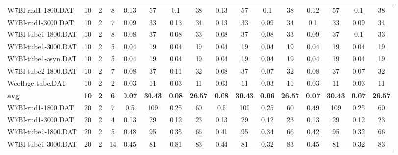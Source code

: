 \begin{sidewaystable}[!ht]
{\begin{tabular}{lccccccccccccccc}
W7BI-rnd1-1800.DAT & 10 & 2 & 8 & 0.13 & 57 &  \textcolor{blue2}{0.1} & 38 & 0.13 & 57 &  \textcolor{blue2}{0.1} & 38 & 0.12 & 57 &  \textcolor{blue2}{0.1} & 38 \\
W7BI-rnd1-3000.DAT & 10 & 2 & 7 &  \textcolor{blue2}{0.09} & 33 & 0.13 & 34 & 0.13 & 33 &  \textcolor{blue2}{0.09} & 34 & 0.1 & 33 &  \textcolor{blue2}{0.09} & 34 \\
W7BI-tube1-1800.DAT & 10 & 2 & 8 &  \textcolor{blue2}{0.08} & 37 &  \textcolor{blue2}{0.08} & 33 &  \textcolor{blue2}{0.08} & 37 &  \textcolor{blue2}{0.08} & 33 & 0.09 & 37 & 0.1 & 33 \\
W7BI-tube1-3000.DAT & 10 & 2 & 5 &  \textcolor{blue2}{0.04} & 19 &  \textcolor{blue2}{0.04} & 19 &  \textcolor{blue2}{0.04} & 19 &  \textcolor{blue2}{0.04} & 19 &  \textcolor{blue2}{0.04} & 19 &  \textcolor{blue2}{0.04} & 19 \\
W7BI-tube1-asyn.DAT & 10 & 2 & 5 &  \textcolor{blue2}{0.04} & 19 &  \textcolor{blue2}{0.04} & 19 &  \textcolor{blue2}{0.04} & 19 &  \textcolor{blue2}{0.04} & 19 &  \textcolor{blue2}{0.04} & 19 &  \textcolor{blue2}{0.04} & 19 \\
W7BI-tube2-1800.DAT & 10 & 2 & 7 & 0.08 & 37 & 0.11 & 32 & 0.08 & 37 &  \textcolor{blue2}{0.07} & 32 & 0.08 & 37 &  \textcolor{blue2}{0.07} & 32 \\
Wcollage-tube.DAT & 10 & 2 & 2 &  \textcolor{blue2}{0.03} & 11 &  \textcolor{blue2}{0.03} & 11 &  \textcolor{blue2}{0.03} & 11 &  \textcolor{blue2}{0.03} & 11 &  \textcolor{blue2}{0.03} & 11 &  \textcolor{blue2}{0.03} & 11 \\
\cline{1-16} \textbf{avg} & \textbf{10} & \textbf{2} & \textbf{6} & \textbf{0.07} & \textbf{30.43} & \textbf{0.08} & \textbf{26.57} & \textbf{0.08} & \textbf{30.43} & \textbf{0.06} & \textbf{26.57} & \textbf{0.07} & \textbf{30.43} & \textbf{0.07} & \textbf{26.57} \\ \cline{1-16}
W7BI-rnd1-1800.DAT & 20 & 2 & 7 & 0.5 & 109 &  \textcolor{blue2}{0.25} & 60 & 0.5 & 109 &  \textcolor{blue2}{0.25} & 60 & 0.49 & 109 &  \textcolor{blue2}{0.25} & 60 \\
W7BI-rnd1-3000.DAT & 20 & 2 & 4 & 0.13 & 29 &  \textcolor{blue2}{0.12} & 23 & 0.13 & 29 &  \textcolor{blue2}{0.12} & 23 & 0.13 & 29 &  \textcolor{blue2}{0.12} & 23 \\
W7BI-tube1-1800.DAT & 20 & 2 & 5 & 0.48 & 95 & 0.35 & 66 & 0.41 & 95 & 0.34 & 66 & 0.42 & 95 &  \textcolor{blue2}{0.32} & 66 \\
W7BI-tube1-3000.DAT & 20 & 2 & 14 & 0.45 & 81 & 0.81 & 83 & 0.44 & 81 &  \textcolor{blue2}{0.32} & 83 & 0.45 & 81 &  \textcolor{blue2}{0.32} & 83 \\

\end{tabular}}
\end{sidewaystable}
